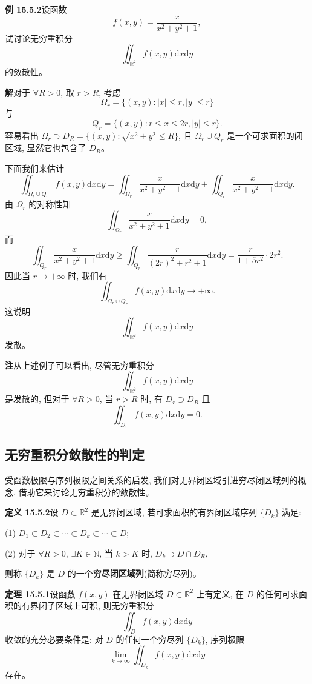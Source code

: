 \documentclass[UTF8, 12pt, fontset=fandol, oneside]{ctexart}
\begin{document}
\noindent\textbf{例 15.5.2}\quad 设函数
\[
  f(x,y)=\frac{x}{x^2+y^2+1},
\]
试讨论无穷重积分
\[
  \iint_{\mathbb R^2} f(x,y)\mathrm dx\mathrm dy
\]
的敛散性。

\noindent\textbf{解}\quad 对于 $\forall R>0$, 取 $r>R$, 考虑
\[
  \Omega_r=\{(x,y):|x|\leqslant r, |y|\leqslant r\}
\]
与
\[
  Q_r=\{(x,y):r\leqslant x\leqslant2r, |y|\leqslant r\}.
\]
容易看出 $\Omega_r\supset D_R=\{(x,y):\sqrt{x^2+y^2}\leqslant R\}$, 且 $\Omega_r\cup Q_r$ 是一个可求面积的闭区域, 显然它也包含了 $D_R$。

下面我们来估计
\[
  \iint_{\Omega_r\cup Q_r} f(x,y)\mathrm dx\mathrm dy
  =\iint_{\Omega_r}\frac{x}{x^2+y^2+1}\mathrm dx\mathrm dy
  +\iint_{Q_r}\frac{x}{x^2+y^2+1}\mathrm dx\mathrm dy.
\]
由 $\Omega_r$ 的对称性知
\[
  \iint_{\Omega_r}\frac{x}{x^2+y^2+1}\mathrm dx\mathrm dy=0,
\]
而
\[
  \iint_{Q_r}\frac{x}{x^2+y^2+1}\mathrm dx\mathrm dy
  \geqslant\iint_{Q_r}\frac{r}{(2r)^2+r^2+1}\mathrm dx\mathrm dy
  =\frac{r}{1+5r^2}\cdot2r^2.
\]
因此当 $r\to+\infty$ 时, 我们有
\[
  \iint_{\Omega_r\cup Q_r} f(x,y)\mathrm dx\mathrm dy\to+\infty.
\]
这说明
\[
  \iint_{\mathbb R^2} f(x,y)\mathrm dx\mathrm dy
\]
发散。

\noindent\textbf{注}\quad 从上述例子可以看出, 尽管无穷重积分
\[
  \iint_{\mathbb R^2} f(x,y)\mathrm dx\mathrm dy
\]
是发散的, 但对于 $\forall R>0$, 当 $r>R$ 时, 有 $D_r\supset D_R$ 且
\[
  \iint_{D_r} f(x,y)\mathrm dx\mathrm dy=0.
\]

\subsection{无穷重积分敛散性的判定}

受函数极限与序列极限之间关系的启发, 我们对无界闭区域引进穷尽闭区域列的概念, 借助它来讨论无穷重积分的敛散性。

\noindent\textbf{定义 15.5.2}\quad 设 $D\subset\mathbb R^2$ 是无界闭区域, 若可求面积的有界闭区域序列 $\{D_k\}$ 满足:

(1) $D_1\subset D_2\subset\cdots\subset D_k\subset\cdots\subset D$;

(2) 对于 $\forall R>0$, $\exists K\in\mathbb N$, 当 $k>K$ 时, $D_k\supset D\cap D_R$,

则称 $\{D_k\}$ 是 $D$ 的一个\textbf{穷尽闭区域列}(简称穷尽列)。

\noindent\textbf{定理 15.5.1}\quad 设函数 $f(x,y)$ 在无界闭区域 $D\subset\mathbb R^2$ 上有定义, 在 $D$ 的任何可求面积的有界闭子区域上可积, 则无穷重积分
\[
  \iint_D f(x,y)\mathrm dx\mathrm dy
\]
收敛的充分必要条件是: 对 $D$ 的任何一个穷尽列 $\{D_k\}$, 序列极限
\[
  \lim_{k\to\infty}\iint_{D_k}f(x,y)\mathrm dx\mathrm dy
\]
存在。
\end{document}
